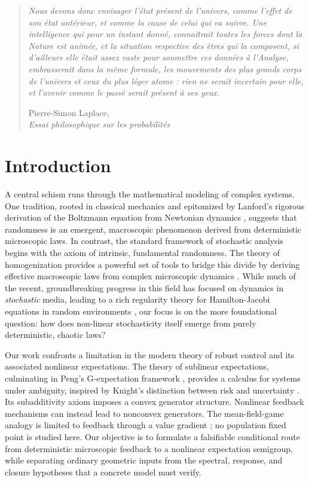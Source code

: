\documentclass[12pt, letterpaper]{amsart}
\theoremstyle{plain}
\theoremstyle{definition}
\theoremstyle{remark}
\begin{document}
\tableofcontents

\begin{quote}
\textit{Nous devons donc envisager l'état présent de l'univers, comme l'effet de son état antérieur, et comme la cause de celui qui va suivre. Une intelligence qui pour un instant donné, connaîtrait toutes les forces dont la Nature est animée, et la situation respective des êtres qui la composent, si d'ailleurs elle était assez vaste pour soumettre ces données à l'Analyse, embrasserait dans la même formule, les mouvements des plus grands corps de l'univers et ceux du plus léger atome : rien ne serait incertain pour elle, et l'avenir comme le passé serait présent à ses yeux.}
\vspace{0.5em}
\par\raggedleft
\textemdash Pierre-Simon Laplace, \\ \textit{Essai philosophique sur les probabilités} \citep{marquis1825essai}
\end{quote}



\section{Introduction}

A central schism runs through the mathematical modeling of complex systems. One tradition, rooted in classical mechanics and epitomized by Lanford's rigorous derivation of the Boltzmann equation from Newtonian dynamics \citep{Lanford1975}, suggests that randomness is an emergent, macroscopic phenomenon derived from deterministic microscopic laws. In contrast, the standard framework of stochastic analysis begins with the axiom of intrinsic, fundamental randomness. The theory of homogenization provides a powerful set of tools to bridge this divide by deriving effective macroscopic laws from complex microscopic dynamics \citep{BensoussanLionsPapanicolaou1978}. While much of the recent, groundbreaking progress in this field has focused on dynamics in \textit{stochastic} media, leading to a rich regularity theory for Hamilton-Jacobi equations in random environments \citep{ArmstrongCardaliaguet2020}, our focus is on the more foundational question: how does non-linear stochasticity itself emerge from purely deterministic, chaotic laws?

Our work confronts a limitation in the modern theory of robust control and its associated nonlinear expectations. The theory of sublinear expectations, culminating in Peng's G-expectation framework \citep{Peng2019}, provides a calculus for systems under ambiguity, inspired by Knight's distinction between risk and uncertainty \citep{Knight1921}. Its subadditivity axiom imposes a convex generator structure. Nonlinear feedback mechanisms can instead lead to nonconvex generators. The mean-field-game analogy is limited to feedback through a value gradient \citep{lasry2007mean,Cardaliaguet2010}; no population fixed point is studied here. Our objective is to formulate a falsifiable conditional route from deterministic microscopic feedback to a nonlinear expectation semigroup, while separating ordinary geometric inputs from the spectral, response, and closure hypotheses that a concrete model must verify.
\end{document}
